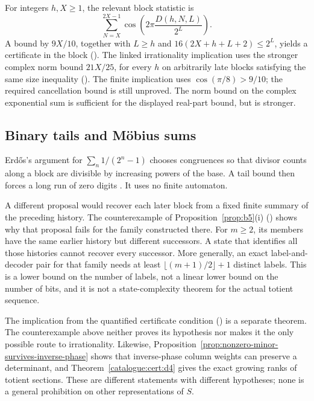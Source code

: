 \begin{description}[leftmargin=*,style=nextline]
\item[Exponential sums of the window residues.]
For integers $h,X\ge1$, the relevant block statistic is
\[
 \sum_{N=X}^{2X-1}\cos\!\left(2\pi\frac{D(h,N,L)}{2^L}\right).
\]
A bound by $9X/10$, together with $L\ge h$ and
$16(2X+h+L+2)\le2^L$, yields a certificate in the block
().
The linked irrationality implication uses the stronger complex norm
bound $21X/25$, for every $h$ on arbitrarily late blocks satisfying
the same size inequality
().
The finite implication uses $\cos(\pi/8)>9/10$; the required cancellation
bound is still unproved. The norm bound on the complex exponential sum
is sufficient for the displayed real-part bound, but is stronger.

\end{description}

\subsection{Binary tails and M\"obius sums}

Erd\H{o}s's argument for $\sum_n1/(2^n-1)$ chooses congruences so
that divisor counts along a block are divisible by increasing powers of
the base. A tail bound then forces a long run of zero digits
\cite[pp.~63--66]{erdos1948lambert}. It uses no finite automaton.

A different proposal would recover each later block from a fixed finite
summary of the preceding history. The counterexample of
Proposition~\ref{prop:b5}(i)
()
shows why that proposal fails for the family constructed there. For
$m\ge2$, its members have the same earlier history but different
successors. A state that identifies all those histories cannot recover
every successor. More generally, an exact label-and-decoder pair for
that family needs at least $\lfloor(m+1)/2\rfloor+1$ distinct labels.
This is a lower bound on the number of labels, not a linear lower bound
on the number of bits, and it is not a state-complexity theorem for the
actual totient sequence.

The implication from the quantified certificate condition
()
is a separate theorem. The counterexample above neither proves its
hypothesis nor makes it the only possible route to irrationality.
Likewise, Proposition~\ref{prop:nonzero-minor-survives-inverse-phase}
shows that inverse-phase column weights can preserve a determinant, and
Theorem~\ref{catalogue:cert:d4} gives the exact growing ranks of totient
sections. These are different
statements with different hypotheses; none is a general prohibition on
other representations of $S$.

